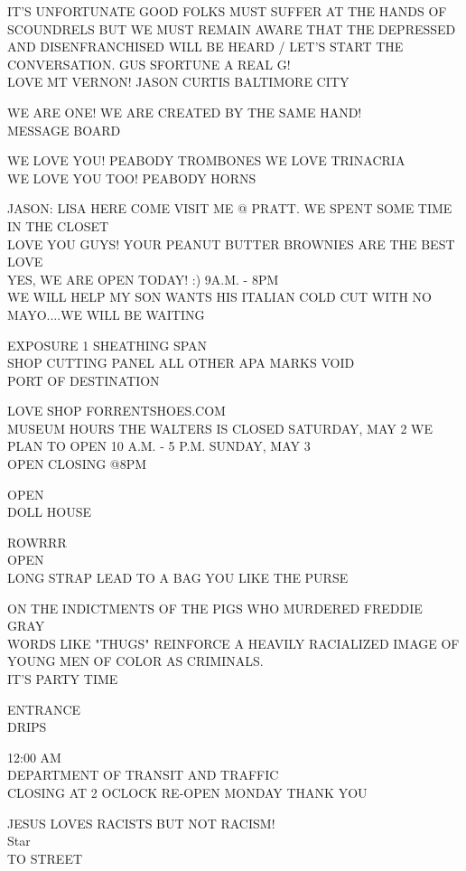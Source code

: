 \documentclass[10pt,letterpaper]{article}
\begin{document}
IT'S UNFORTUNATE GOOD FOLKS MUST SUFFER AT THE HANDS OF SCOUNDRELS BUT WE MUST REMAIN AWARE THAT THE DEPRESSED AND DISENFRANCHISED WILL BE HEARD / LET'S START THE CONVERSATION.  GUS SFORTUNE A REAL G!\\
LOVE MT VERNON!  JASON CURTIS BALTIMORE CITY

WE ARE ONE!  WE ARE CREATED BY THE SAME HAND!\\
MESSAGE BOARD

WE LOVE YOU!  PEABODY TROMBONES WE LOVE TRINACRIA\\
WE LOVE YOU TOO!  PEABODY HORNS

JASON: LISA HERE COME VISIT ME @ PRATT.  WE SPENT SOME TIME IN THE CLOSET\\
LOVE YOU GUYS!  YOUR PEANUT BUTTER BROWNIES ARE THE BEST LOVE\\
YES, WE ARE OPEN TODAY! :)  9A.M. {-} 8PM\\
WE WILL HELP MY SON WANTS HIS ITALIAN COLD CUT WITH NO MAYO....WE WILL BE WAITING

EXPOSURE 1 SHEATHING SPAN\\
SHOP CUTTING PANEL ALL OTHER APA MARKS VOID\\
PORT OF DESTINATION

LOVE SHOP FORRENTSHOES.COM\\
MUSEUM HOURS THE WALTERS IS CLOSED SATURDAY, MAY 2 WE PLAN TO OPEN 10 A.M. {-} 5 P.M. SUNDAY, MAY 3\\
OPEN CLOSING @8PM

OPEN\\
DOLL HOUSE

ROWRRR\\
OPEN\\
LONG STRAP LEAD TO A BAG YOU LIKE THE PURSE

ON THE INDICTMENTS OF THE PIGS WHO MURDERED FREDDIE GRAY\\
WORDS LIKE "THUGS" REINFORCE A HEAVILY RACIALIZED IMAGE OF YOUNG MEN OF COLOR AS CRIMINALS.\\
IT'S PARTY TIME

ENTRANCE\\
DRIPS

12:00 AM\\
DEPARTMENT OF TRANSIT AND TRAFFIC\\
CLOSING AT 2 OCLOCK RE{-}OPEN MONDAY THANK YOU

JESUS LOVES RACISTS BUT NOT RACISM!\\
Star\\
TO STREET
\end{document}
